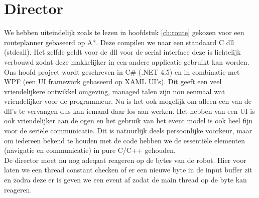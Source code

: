 \documentclass{report}
\begin{document}
\section{Director}
We hebben uiteindelijk zoals te lezen in hoofdstuk \ref{ch:route} gekozen voor een routeplanner gebaseerd op A*. Deze compilen we naar een standaard C dll (stdcall). Het zelfde geldt voor de dll voor de serial interface deze is lichtelijk verbouwd zodat deze makkelijker in een andere applicatie gebruikt kan worden. Ons hoofd project wordt geschreven in C\# (.NET 4.5) en in combinatie met WPF (een UI framework gebaseerd op XAML UI's). Dit geeft een veel vriendelijkere ontwikkel omgeving, managed talen zijn nou eenmaal wat vriendelijker voor de programmeur. Nu is het ook mogelijk om alleen een van de dll's te vervangen dus kan iemand daar los aan werken. Het hebben van een UI is ook vriendelijker aan de ogen en het gebruik van het event model is ook heel fijn voor de seriële communicatie. Dit is natuurlijk deels persoonlijke voorkeur, maar om iedereen bekend te houden met de code hebben we de essentiële elementen (navigatie en communicatie) in pure C/C++ gehouden.\\
De director moet nu nog adeqaat reageren op de bytes van de robot. Hier voor laten we een thread constant checken of er een nieuwe byte in de input buffer zit en zodra deze er is geven we een event af zodat de main thread op de byte kan reageren.
\end{document}
